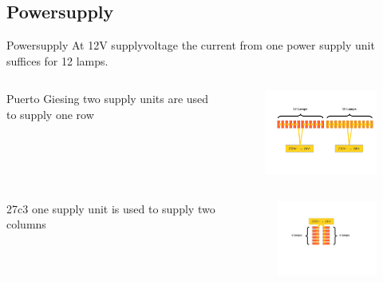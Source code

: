 \documentclass{beamer}
\begin{document}
\subsection{Powersupply}
  \begin{frame}{Powersupply}
  At 12V supplyvoltage the current from one power supply unit suffices for 12 lamps.
  \begin{columns}
    \begin{column}{4cm}
     \begin{block}{ Puerto Giesing}
     two supply units are used to supply one row
     \end{block}
    \end{column}
    \begin{column}{7cm}
    \begin{figure}
    \includegraphics[width=6cm, clip, trim= 2.5cm 4.6cm 0.5cm 4cm]{bilder/12lampen.pdf}
    \end{figure}
    \end{column}
  \end{columns}
  \begin{columns}[T]
    \begin{column}{4cm}
    \vskip 0.4cm 
    \begin{block}{27c3}
     one supply unit is used to supply two columns 
    \end{block}
    \end{column}
    \begin{column}{7cm}
    \begin{figure}
    \includegraphics[width=4cm, clip, trim= 4cm 5cm 7cm 4cm]{bilder/6lampen.pdf}
    \end{figure}
    \end{column}
  \end{columns}
  \end{frame} 
\end{document}
